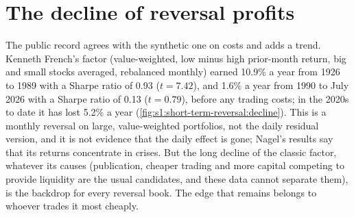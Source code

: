 \begin{omfigure}

\label{fig:s1:short-term-reversal:earnings}
\end{omfigure}

\section{The decline of reversal profits}

The public record agrees with the synthetic one on costs and adds a trend. Kenneth French's  factor (value-weighted, low minus high
prior-month return, big and small stocks averaged, rebalanced monthly) earned 10.9\% a year from 1926 to 1989 with a Sharpe ratio of 0.93 ($t = 7.42$), and
1.6\% a year from 1990 to July 2026 with a Sharpe ratio of 0.13 ($t = 0.79$), before any trading costs; in the 2020s to date it has lost 5.2\% a year
(\cref{fig:s1:short-term-reversal:decline}). This is a monthly reversal on large, value-weighted portfolios, not the daily residual version, and it is not
evidence that the daily effect is gone; Nagel's results say that its returns concentrate in crises. But the long decline of the classic factor,
whatever its causes (publication, cheaper trading and more capital competing to provide liquidity are the usual candidates, and these data cannot
separate them), is the backdrop for every reversal book. The edge that remains belongs to
whoever trades it most cheaply.

